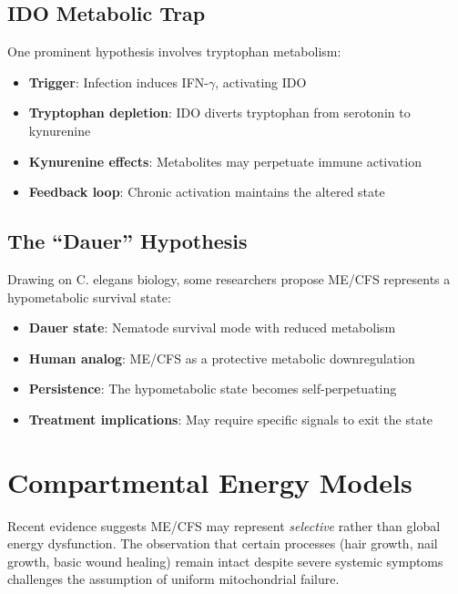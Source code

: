 \subsection{IDO Metabolic Trap}

One prominent hypothesis involves tryptophan metabolism:

\begin{itemize}
    \item \textbf{Trigger}: Infection induces IFN-$\gamma$, activating IDO
    \item \textbf{Tryptophan depletion}: IDO diverts tryptophan from serotonin to kynurenine
    \item \textbf{Kynurenine effects}: Metabolites may perpetuate immune activation
    \item \textbf{Feedback loop}: Chronic activation maintains the altered state
\end{itemize}

\subsection{The ``Dauer'' Hypothesis}

Drawing on C. elegans biology, some researchers propose ME/CFS represents a hypometabolic survival state:

\begin{itemize}
    \item \textbf{Dauer state}: Nematode survival mode with reduced metabolism
    \item \textbf{Human analog}: ME/CFS as a protective metabolic downregulation
    \item \textbf{Persistence}: The hypometabolic state becomes self-perpetuating
    \item \textbf{Treatment implications}: May require specific signals to exit the state
\end{itemize}


\section{Compartmental Energy Models}
\label{sec:compartmental-energy}

Recent evidence suggests ME/CFS may represent \emph{selective} rather than global energy dysfunction. The observation that certain processes (hair growth, nail growth, basic wound healing) remain intact despite severe systemic symptoms challenges the assumption of uniform mitochondrial failure.

